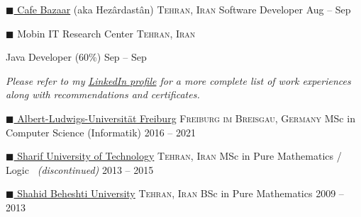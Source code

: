 \documentclass[10pt,a4paper]{article}
\newcommand{\colorsquare}[1]{\textcolor{#1}{$\blacksquare$}}
\begin{document}
\headedsection  %
  {\href{https://en.wikipedia.org/wiki/Cafe_Bazaar}{\colorsquare{bazaar} Cafe Bazaar} (aka Hezârdastân)}
  {\textsc{Tehran, Iran}} {%
  \headedsubsection
    {Software Developer}
    {Aug  -- Sep }
    {}
}

\headedsection
  {\colorsquare{camouflagegreen} Mobin IT Research Center}
  {\textsc{Tehran, Iran}} {%

  \headedsubsection
    {Java Developer (60\%)}
    {Sep  -- Sep }
    {}
}

\vspace{-0.2em}
\begin{center}
  \emph{\small Please refer to my \href{http://www.linkedin.com/in/aerabi}{LinkedIn profile} for a more complete list of work experiences along with recommendations and certificates.}
\end{center}

\spacedhrule{-0.2em}{-0.4em}


\headedsection
  {\href{http://www.uni-freiburg.de/}{\colorsquare{carolinablue} Albert-Ludwigs-Universität Freiburg}}
  {\textsc{Freiburg im Breisgau, Germany}} {%
  \headedsubsection
    {MSc in Computer Science (Informatik)}
    {2016 -- 2021}
    {}
}

\headedsection
  {\href{http://www.en.sharif.edu/}{\colorsquare{amethyst} Sharif University of Technology}}
  {\textsc{Tehran, Iran}} {%
  \headedsubsection
    {MSc in Pure Mathematics / Logic \textnormal{\textit{~(discontinued)}}}
    {2013 -- 2015} 
    {}
}

\headedsection
  {\href{http://en.sbu.ac.ir/}{\colorsquare{brickred} Shahid Beheshti University}}
  {\textsc{Tehran, Iran}} {%
  \headedsubsection
    {BSc in Pure Mathematics}
    {2009 -- 2013} 
    {
    }
}
\end{document}
